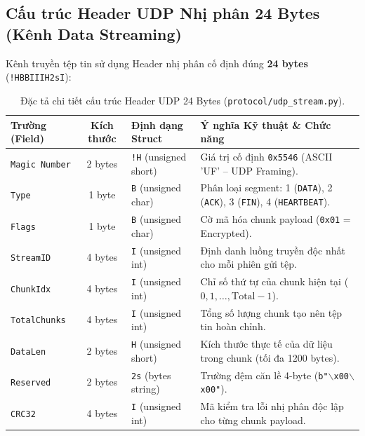 \documentclass[11pt,a4paper]{article}
\begin{document}
\subsection{Cấu trúc Header UDP Nhị phân 24 Bytes (Kênh Data Streaming)}
Kênh truyền tệp tin sử dụng Header nhị phân cố định đúng \textbf{24 bytes} (\texttt{!HBBIIIH2sI}):

\begin{table}[htbp]
\centering
\small
\begin{tabularx}{\textwidth}{lcp{2.8cm}X}
\toprule
\rowcolor{headergray}
\textbf{Trường (Field)} & \textbf{Kích thước} & \textbf{Định dạng Struct} & \textbf{Ý nghĩa Kỹ thuật \& Chức năng} \\
\midrule
\texttt{Magic Number} & 2 bytes & \texttt{!H} (unsigned short) & Giá trị cố định \texttt{0x5546} (ASCII 'UF' -- UDP Framing). \\
\texttt{Type} & 1 byte & \texttt{B} (unsigned char) & Phân loại segment: 1 (\texttt{DATA}), 2 (\texttt{ACK}), 3 (\texttt{FIN}), 4 (\texttt{HEARTBEAT}). \\
\texttt{Flags} & 1 byte & \texttt{B} (unsigned char) & Cờ mã hóa chunk payload (\texttt{0x01} = Encrypted). \\
\texttt{StreamID} & 4 bytes & \texttt{I} (unsigned int) & Định danh luồng truyền độc nhất cho mỗi phiên gửi tệp. \\
\texttt{ChunkIdx} & 4 bytes & \texttt{I} (unsigned int) & Chỉ số thứ tự của chunk hiện tại ($0, 1, \dots, \text{Total}-1$). \\
\texttt{TotalChunks} & 4 bytes & \texttt{I} (unsigned int) & Tổng số lượng chunk tạo nên tệp tin hoàn chỉnh. \\
\texttt{DataLen} & 2 bytes & \texttt{H} (unsigned short) & Kích thước thực tế của dữ liệu trong chunk (tối đa 1200 bytes). \\
\texttt{Reserved} & 2 bytes & \texttt{2s} (bytes string) & Trường đệm căn lề 4-byte (\texttt{b"$\backslash$x00$\backslash$x00"}). \\
\texttt{CRC32} & 4 bytes & \texttt{I} (unsigned int) & Mã kiểm tra lỗi nhị phân độc lập cho từng chunk payload. \\
\bottomrule
\end{tabularx}
\caption{Đặc tả chi tiết cấu trúc Header UDP 24 Bytes (\texttt{protocol/udp_stream.py}).}
\label{tab:udp_header}
\end{table}
\end{document}
